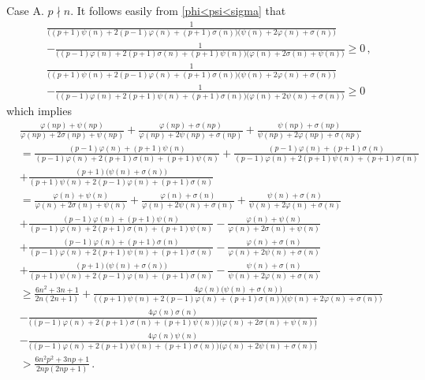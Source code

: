 \documentclass[12pt]{article}
\begin{document}
Case A.  \;  $p\nmid n$. It follows easily from \eqref{phi<psi<sigma} that
\begin{align*}
&\frac{1}{\big((p+1)\psi(n)+2(p-1)\varphi(n)+(p+1)\sigma(n)\big)\big(\psi(n)+2\varphi(n)+\sigma(n)\big)}\\
&-\frac{1}{\big((p-1)\varphi(n)+2(p+1)\sigma(n)+(p+1)\psi(n)\big)\big(\varphi(n)+2\sigma(n)+\psi(n)\big)}\geq0\,,\\
&\frac{1}{\big((p+1)\psi(n)+2(p-1)\varphi(n)+(p+1)\sigma(n)\big)\big(\psi(n)+2\varphi(n)+\sigma(n)\big)}\\
&-\frac{1}{\big((p-1)\varphi(n)+2(p+1)\psi(n)+(p+1)\sigma(n)\big)\big(\varphi(n)+2\psi(n)+\sigma(n)\big)}\geq0
\end{align*}
which  implies
\begin{align*}
&\frac{\varphi(np)+\psi(np)}{\varphi(np)+2\sigma(np)+\psi(np)}+\frac{\varphi(np)+\sigma(np)}{\varphi(np)+2\psi(np)+\sigma(np)}+\frac{\psi(np)+\sigma(np)}{\psi(np)+2\varphi(np)+\sigma(np)}\\
&=\frac{(p-1)\varphi(n)+(p+1)\psi(n)}{(p-1)\varphi(n)+2(p+1)\sigma(n)+(p+1)\psi(n)}+\frac{(p-1)\varphi(n)+(p+1)\sigma(n)}{(p-1)\varphi(n)+2(p+1)\psi(n)+(p+1)\sigma(n)}\\
&+\frac{(p+1)\big(\psi(n)+\sigma(n)\big)}{(p+1)\psi(n)+2(p-1)\varphi(n)+(p+1)\sigma(n)}\\
&=\frac{\varphi(n)+\psi(n)}{\varphi(n)+2\sigma(n)+\psi(n)}+\frac{\varphi(n)+\sigma(n)}{\varphi(n)+2\psi(n)+\sigma(n)}+\frac{\psi(n)+\sigma(n)}{\psi(n)+2\varphi(n)+\sigma(n)}\\
&+\frac{(p-1)\varphi(n)+(p+1)\psi(n)}{(p-1)\varphi(n)+2(p+1)\sigma(n)+(p+1)\psi(n)}-\frac{\varphi(n)+\psi(n)}{\varphi(n)+2\sigma(n)+\psi(n)}\\
&+\frac{(p-1)\varphi(n)+(p+1)\sigma(n)}{(p-1)\varphi(n)+2(p+1)\psi(n)+(p+1)\sigma(n)}-\frac{\varphi(n)+\sigma(n)}{\varphi(n)+2\psi(n)+\sigma(n)}\\
&+\frac{(p+1)\big(\psi(n)+\sigma(n)\big)}{(p+1)\psi(n)+2(p-1)\varphi(n)+(p+1)\sigma(n)}-\frac{\psi(n)+\sigma(n)}{\psi(n)+2\varphi(n)+\sigma(n)}\\
&\geq\frac{6n^2+3n+1}{2n(2n+1)}+\frac{4\varphi(n)\big(\psi(n)+\sigma(n)\big)}{\big((p+1)\psi(n)+2(p-1)\varphi(n)+(p+1)\sigma(n)\big)\big(\psi(n)+2\varphi(n)+\sigma(n)\big)}\\
&-\frac{4\varphi(n)\sigma(n)}{\big((p-1)\varphi(n)+2(p+1)\sigma(n)+(p+1)\psi(n)\big)\big(\varphi(n)+2\sigma(n)+\psi(n)\big)}\\
&-\frac{4\varphi(n)\psi(n)}{\big((p-1)\varphi(n)+2(p+1)\psi(n)+(p+1)\sigma(n)\big)\big(\varphi(n)+2\psi(n)+\sigma(n)\big)}\\
&>\frac{6n^2p^2+3np+1}{2np(2np+1)}\,.
\end{align*}
\end{document}
